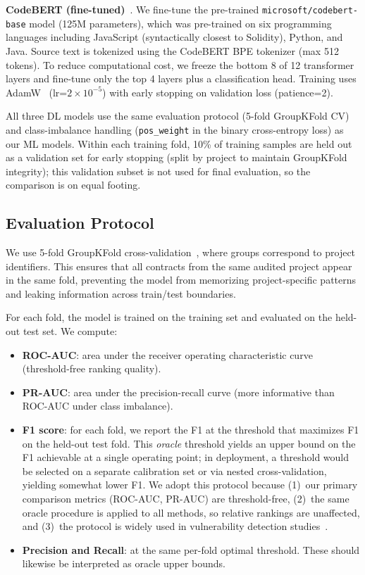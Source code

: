 \documentclass[11pt,a4paper]{article}
\begin{document}
\textbf{CodeBERT (fine-tuned)}~\cite{feng2020codebert}.
We fine-tune the pre-trained \texttt{microsoft/codebert-base} model (125M parameters), which was pre-trained on six programming languages including JavaScript (syntactically closest to Solidity), Python, and Java.
Source text is tokenized using the CodeBERT BPE tokenizer (max 512 tokens).
To reduce computational cost, we freeze the bottom 8 of 12 transformer layers and fine-tune only the top 4 layers plus a classification head.
Training uses AdamW~\cite{loshchilov2019adamw} (lr=$2 \times 10^{-5}$) with early stopping on validation loss (patience=2).

All three DL models use the same evaluation protocol (5-fold GroupKFold CV) and class-imbalance handling (\texttt{pos\_weight} in the binary cross-entropy loss) as our ML models.
Within each training fold, 10\% of training samples are held out as a validation set for early stopping (split by project to maintain GroupKFold integrity); this validation subset is not used for final evaluation, so the comparison is on equal footing.

\subsection{Evaluation Protocol}
\label{sec:eval_protocol}

We use 5-fold GroupKFold cross-validation~\cite{pedregosa2011scikit}, where groups correspond to project identifiers.
This ensures that all contracts from the same audited project appear in the same fold, preventing the model from memorizing project-specific patterns and leaking information across train/test boundaries.

For each fold, the model is trained on the training set and evaluated on the held-out test set.
We compute:
\begin{itemize}
    \item \textbf{ROC-AUC}: area under the receiver operating characteristic curve (threshold-free ranking quality).
    \item \textbf{PR-AUC}: area under the precision-recall curve (more informative than ROC-AUC under class imbalance).
    \item \textbf{F1 score}: for each fold, we report the F1 at the threshold that maximizes F1 on the held-out test fold. This \emph{oracle} threshold yields an upper bound on the F1 achievable at a single operating point; in deployment, a threshold would be selected on a separate calibration set or via nested cross-validation, yielding somewhat lower F1. We adopt this protocol because (1)~our primary comparison metrics (ROC-AUC, PR-AUC) are threshold-free, (2)~the same oracle procedure is applied to all methods, so relative rankings are unaffected, and (3)~the protocol is widely used in vulnerability detection studies~\cite{fu2022linevul,zhuang2020smart}.
    \item \textbf{Precision and Recall}: at the same per-fold optimal threshold. These should likewise be interpreted as oracle upper bounds.
\end{itemize}
\end{document}
